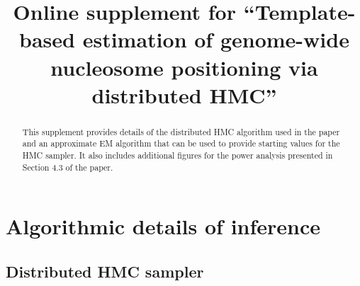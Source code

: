 \documentclass[12pt]{article}
\def\pythonstyle{}
\begin{document}
\ifx \pythonstyle \undefined
\else
\AlgoDontDisplayBlockMarkers \SetAlgoNoEnd \SetAlgoNoLine%
\SetStartEndCondition{ }{}{}%
%
%
%
%
%
\fi

\graphicspath{{./figures/}}

\pagestyle{empty}

\title{Online supplement for ``Template-based estimation of genome-wide nucleosome positioning via distributed HMC''}
\date{}

\maketitle

\begin{abstract}
This supplement provides details of the distributed HMC algorithm used in the paper and an approximate EM algorithm that can be used to provide starting values for the HMC sampler.
It also includes additional figures for the power analysis presented in Section 4.3 of the paper.
\end{abstract}

\tableofcontents 

\clearpage

\pagestyle{fancy}

\appendix

\section{Algorithmic details of inference}

\subsection{Distributed HMC sampler}
\label{sec:mcmc}
\end{document}
